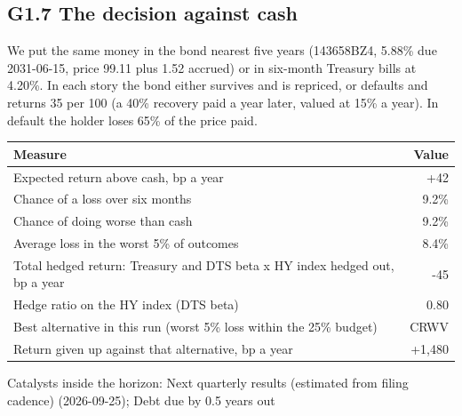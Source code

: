 \documentclass[11pt,a4paper]{article}
\begin{document}
\subsection*{G1.7 The decision against cash}
We put the same money in the bond nearest five years (143658BZ4, 5.88\% due 2031-06-15, price 99.11 plus 1.52 accrued) or in six-month Treasury bills at 4.20\%. In each story the bond either survives and is repriced, or defaults and returns 35 per 100 (a 40\% recovery paid a year later, valued at 15\% a year). In default the holder loses 65\% of the price paid.
\begin{center}\footnotesize\setlength{\tabcolsep}{3.5pt}\begin{tabular}{@{}lr@{}}\toprule
Measure & Value \\\midrule
Expected return above cash, bp a year & +42 \\
Chance of a loss over six months & 9.2\% \\
Chance of doing worse than cash & 9.2\% \\
Average loss in the worst 5\% of outcomes & 8.4\% \\
Total hedged return: Treasury and DTS beta x HY index hedged out, bp a year & -45 \\
Hedge ratio on the HY index (DTS beta) & 0.80 \\
Best alternative in this run (worst 5\% loss within the 25\% budget) & CRWV \\
Return given up against that alternative, bp a year & +1,480 \\
\bottomrule\end{tabular}\end{center}
Catalysts inside the horizon: Next quarterly results (estimated from filing cadence) (2026-09-25); Debt due by 0.5 years out
\end{document}
